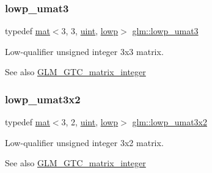 \subsubsection{\texorpdfstring{lowp\+\_\+umat3}{lowp\_umat3}}
{\footnotesize\ttfamily typedef \mbox{\hyperlink{structglm_1_1mat}{mat}}$<$3, 3, \mbox{\hyperlink{group__core__precision_ga4fd29415871152bfb5abd588334147c8}{uint}}, \mbox{\hyperlink{namespaceglm_a36ed105b07c7746804d7fdc7cc90ff25ae161af3fc695e696ce3bf69f7332bc2d}{lowp}}$>$ \mbox{\hyperlink{group__gtc__matrix__integer_gaab0c883cd04a3684accd02854daa7b1d}{glm\+::lowp\+\_\+umat3}}}

Low-\/qualifier unsigned integer 3x3 matrix. \begin{DoxySeeAlso}{See also}
\mbox{\hyperlink{group__gtc__matrix__integer}{G\+L\+M\+\_\+\+G\+T\+C\+\_\+matrix\+\_\+integer}} 
\end{DoxySeeAlso}
\mbox{\label{group__gtc__matrix__integer_ga8beb1d63e9d2abe5659fe53ac064c6c5}} 
\subsubsection{\texorpdfstring{lowp\+\_\+umat3x2}{lowp\_umat3x2}}
{\footnotesize\ttfamily typedef \mbox{\hyperlink{structglm_1_1mat}{mat}}$<$3, 2, \mbox{\hyperlink{group__core__precision_ga4fd29415871152bfb5abd588334147c8}{uint}}, \mbox{\hyperlink{namespaceglm_a36ed105b07c7746804d7fdc7cc90ff25ae161af3fc695e696ce3bf69f7332bc2d}{lowp}}$>$ \mbox{\hyperlink{group__gtc__matrix__integer_ga8beb1d63e9d2abe5659fe53ac064c6c5}{glm\+::lowp\+\_\+umat3x2}}}

Low-\/qualifier unsigned integer 3x2 matrix. \begin{DoxySeeAlso}{See also}
\mbox{\hyperlink{group__gtc__matrix__integer}{G\+L\+M\+\_\+\+G\+T\+C\+\_\+matrix\+\_\+integer}} 
\end{DoxySeeAlso}
\mbox{\label{group__gtc__matrix__integer_ga267cf15202746fe0bd9b493ce2e98652}} 
